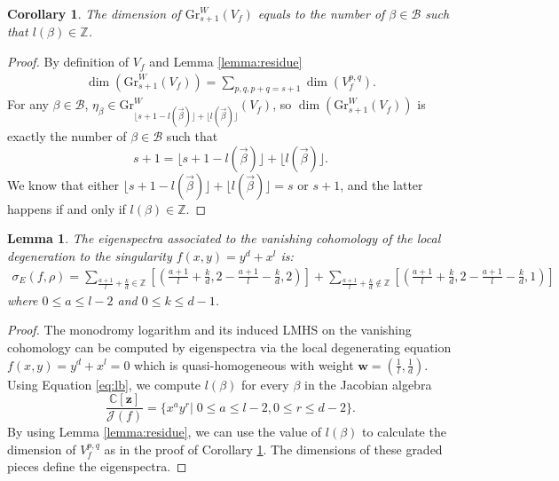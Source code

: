 \documentclass[12pt, letterpaper]{amsart}
\theoremstyle{plain}
\newtheorem{lemma}[theorem]{Lemma}
\newtheorem{corollary}[theorem]{Corollary}
\theoremstyle{definition}
\begin{document}
\begin{corollary}\label{cor:GrWlb}
The dimension of $\mathrm{Gr}_{s+1}^{W}(V_f)$ equals to the number of $\beta\in \mathcal{B}$ such that $l(\beta)\in \mathbb{Z}$.
\end{corollary}
\begin{proof}
By definition of $V_f$ and Lemma \ref{lemma:residue}
\begin{align*}
\dim \left( \mathrm{Gr}_{s+1}^{W}(V_f)  \right)
= \sum_{p,q, p+q = s+1} \dim(V^{p,q}_f) .  
\end{align*}
For any $\beta\in \mathcal{B}$, $\eta_{\beta}\in \mathrm{Gr}_{\lfloor s+1-l(\vec{\beta})\rfloor + \lfloor  l(\vec{\beta})\rfloor}^{W}(V_f)$, so $\dim \left( \mathrm{Gr}_{s+1}^{W}(V_f)  \right)$ is exactly the number of $\beta\in \mathcal{B}$ such that
\[
s+1 = \lfloor s+1-l(\vec{\beta})\rfloor + \lfloor  l(\vec{\beta})\rfloor. 
\]
We know that either $\lfloor s+1-l(\vec{\beta})\rfloor + \lfloor  l(\vec{\beta})\rfloor = s$ or $s+1$, and the latter happens if and only if $l(\beta) \in \mathbb{Z}$. 
\end{proof}



\begin{lemma}
The eigenspectra associated to the vanishing cohomology of the local degeneration  to the singularity  $f(x,y)=y^d+x^l$ is:
\begin{align*}
    \sigma_E(f,\rho) = \sum_{\frac{a+1}{l}+\frac{k}{d}\in \mathbb{Z}}[(\frac{a+1}{l}+\frac{k}{d}, 2-\frac{a+1}{l}-\frac{k}{d}, 2)]
    + \sum_{\frac{a+1}{l}+\frac{k}{d}\notin \mathbb{Z}}[(\frac{a+1}{l}+\frac{k}{d}, 2-\frac{a+1}{l}-\frac{k}{d}, 1)]    
\end{align*}
where $0\leq a\leq l-2$ and $0\leq k \leq d-1$.
\end{lemma}
\begin{proof}
The monodromy logarithm and its induced LMHS on the vanishing cohomology can be computed by eigenspectra via the local degenerating equation $f(x,y)=y^d+x^l=0$ which is quasi-homogeneous with weight $\mathbf{w}=(\frac{1}{l},\frac{1}{d})$. 
Using Equation \eqref{eq:lb}, we compute $l(\beta)$ for every $\beta$ in the Jacobian algebra 
\[
\frac{\mathbb{C}[\mathbf{z}]}{\mathcal{J}(f)}
=
\{x^ay^r|\; 0\leq a\leq l-2, 0\leq r\leq d-2\}.
\]
By using Lemma \ref{lemma:residue}, we can use the value of $l(\beta)$ to calculate the dimension of $V_{f}^{p,q}$ as in the proof of Corollary \ref{cor:GrWlb}. The dimensions of these graded pieces define the eigenspectra. 
\end{proof}
\end{document}
